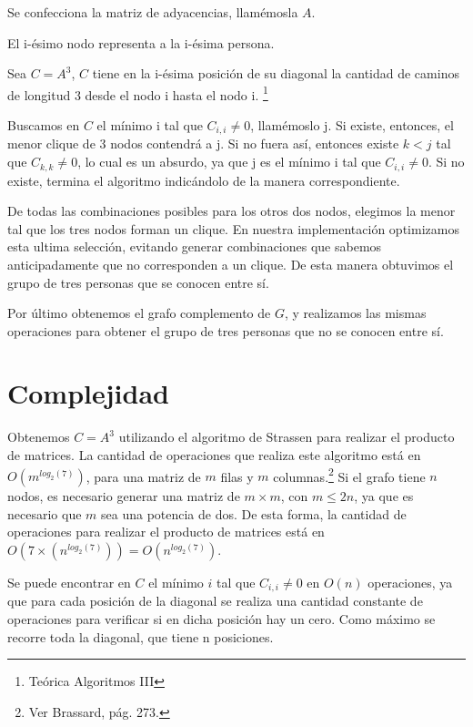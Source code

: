 \documentclass[a4paper, 12pt]{article}
\begin{document}
Se confecciona la matriz de adyacencias, llam\'emosla $A$.


El i-\'esimo nodo representa a la i-\'esima persona.


Sea $C = A^3$, $C$ tiene en la i-\'esima posici\'on de su diagonal la cantidad de caminos de longitud 3 desde el nodo i hasta el nodo i. \footnote{Te\'orica Algoritmos III}   

 
Buscamos en $C$ el m\'inimo i tal que $C_{i,i} \neq 0$, llam\'emoslo j. Si existe, entonces, el menor clique de 3 nodos contendr\'a a j. Si no fuera as\'i, entonces existe $k < j$ tal que $C_{k,k} \neq 0$, lo cual es un absurdo, ya que j es el m\'inimo i tal que $C_{i,i} \neq 0$. Si no existe, termina el algoritmo indic\'andolo de la manera correspondiente.


De todas las combinaciones posibles para los otros dos nodos, elegimos la menor tal que los tres nodos forman un clique. En nuestra implementaci\'on optimizamos esta ultima selecci\'on, evitando generar combinaciones que sabemos anticipadamente que no corresponden a un clique. De esta manera obtuvimos el grupo de tres personas que se conocen entre s\'i.


Por \'ultimo obtenemos el grafo complemento de $G$, y realizamos las mismas operaciones para obtener el grupo de tres personas que no se conocen entre s\'i.



\section*{Complejidad}


Obtenemos $C = A^3$ utilizando el algoritmo de Strassen para realizar el producto de matrices. La cantidad de operaciones que realiza este algoritmo est\'a en $O\left(m^{log_2\left(7\right)}\right)$, para una matriz de $m$ filas y $m$ columnas.\footnote{Ver Brassard, p\'ag. 273.} Si el grafo tiene $n$ nodos, es necesario generar una matriz de $m \times m$, con $m \leq 2n$, ya que es necesario que $m$ sea una potencia de dos. De esta forma, la cantidad de operaciones para realizar el producto de matrices est\'a en $O\left(7 \times \left(n ^{log_2 \left( 7\right)} \right) \right) = O\left(n^{log_2\left(7\right)}\right)$.



Se puede encontrar en $C$ el m\'inimo $i$ tal que $C_{i,i} \neq 0$ en $O\left(n\right)$ operaciones, ya que para cada posici\'on de la diagonal se realiza una cantidad constante de operaciones para verificar si en dicha posici\'on hay un cero. Como m\'aximo se recorre toda la diagonal, que tiene n posiciones.
\end{document}

